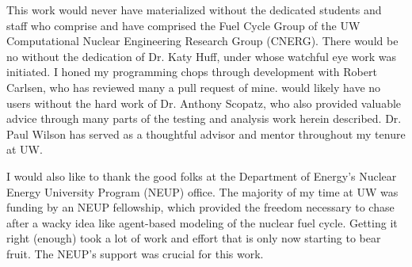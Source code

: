 
This work would never have materialized without the dedicated students and staff
who comprise and have comprised the Fuel Cycle Group of the UW Computational
Nuclear Engineering Research Group (CNERG). There would be no \Cyclus without
the dedication of Dr. Katy Huff, under whose watchful eye \Cyclus work was
initiated. I honed my programming chops through \Cyclus development with Robert
Carlsen, who has reviewed many a pull request of mine. \Cyclus would likely have
no users without the hard work of Dr. Anthony Scopatz, who also provided
valuable advice through many parts of the testing and analysis work herein
described. Dr. Paul Wilson has served as a thoughtful advisor and mentor
throughout my tenure at UW.

I would also like to thank the good folks at the Department of Energy's Nuclear
Energy University Program (NEUP) office. The majority of my time at UW was
funding by an NEUP fellowship, which provided the freedom necessary to chase
after a wacky idea like agent-based modeling of the nuclear fuel cycle. Getting
it right (enough) took a lot of work and effort that is only now starting to
bear fruit. The NEUP's support was crucial for this work.
